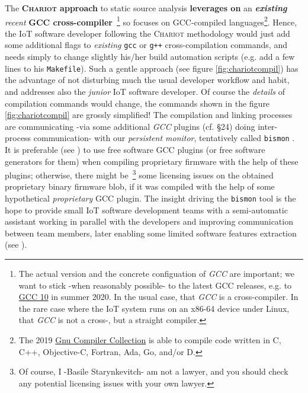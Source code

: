 \medskip

The \textbf{\textsc{Chariot} approach} to static source analysis
\textbf{leverages on} an \textbf{\emph{existing}} \emph{recent}
\textbf{GCC cross-compiler}~\footnote{The actual version and the
  concrete configuation of \emph{GCC} are important; we want to stick
  -when reasonably possible- to the latest GCC releases, e.g. to
  \href{https://gcc.gnu.org/gcc-10/}{GCC 10} in summer 2020. In the
  usual case, that \emph{GCC} is a cross-compiler. In the rare case
  where the IoT system runs on an x86-64 device under Linux, that
  \emph{GCC} is not a cross-, but a straight compiler.} so focuses on
GCC-compiled languages\footnote{The 2019
  \href{https://gcc.gnu.org/}{Gnu Compiler Collection} is able to
  compile code written in C, C++, Objective-C, Fortran, Ada, Go,
  and/or D.}. Hence, the IoT software developer following the
\textsc{Chariot} methodology would just add some additional flags to
\emph{existing} \texttt{gcc} or \texttt{g++} cross-compilation
commands, and needs simply to change slightly his/her build automation
scripts (e.g. add a few lines to his \texttt{Makefile}). Such a gentle
approach (see figure \ref{fig:chariotcompil}) has the advantage of not
disturbing much the usual developer workflow and habit, and addresses
also the \emph{junior} IoT software developer. Of course the \emph
{details} of compilation commands would change, the commands shown in
the figure \ref{fig:chariotcompil} are grossly simplified! The
compilation and linking processes are communicating -via some
additional \emph{GCC} plugins (cf. \cite{gcc-internals} \S24) doing
inter-process communication- with our 
 \emph{persistent monitor}, tentatively
called \texttt{bismon} . It is preferable (see
\cite{gcc-runtime-library-exception}) to use free software GCC plugins
(or free software generators for them) when compiling proprietary
firmware with the help of these plugins; otherwise, there might
be~\footnote{Of course, I -Basile Starynkevitch- am not a lawyer, and
  you should check any potential licensing issues with your own
  lawyer.}  some licensing issues on the obtained proprietary binary
firmware blob, if it was compiled with the help of some hypothetical
\emph{proprietary} GCC plugin. The insight driving the \texttt{bismon}
tool is the hope to provide small IoT software development teams with
a semi-automatic assistant working in parallel with the developers and
improving communication between team members, later enabling some
limited software features extraction (see
\cite{Asanovic:2006:landscape, Brooks:1987:NSB, Brooks:1995:MM,
  zuboff:2015:big-other, Perez:2020:query-reformul}).

